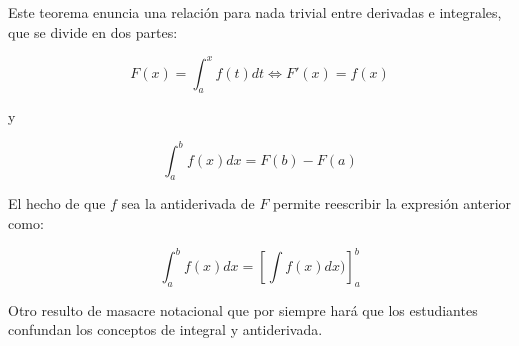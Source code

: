 Este teorema enuncia una relación para nada trivial entre derivadas e integrales, que se divide en dos partes:

$$F(x) = \int_a^x f(t) dt \iff F'(x) = f(x)$$

y

$$\int_a^b f(x) dx = F(b) - F(a)$$

El hecho de que $f$ sea la antiderivada de $F$ permite reescribir la expresión anterior como:

$$\int_a^b f(x) dx = \left[\int f(x) dx)\right]_{a}^{b}$$

Otro resulto de masacre notacional que por siempre hará que los estudiantes confundan los conceptos de integral y antiderivada.

\newpage
